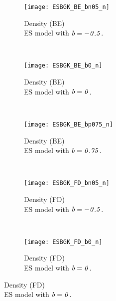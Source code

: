 \documentclass{rsproca}%
\begin{document}
\begin{figure}
        \centering
        \begin{subfigure}[b]{0.32\textwidth}
                \centering
                \texttt{[image: ESBGK\_BE\_bn05\_n]}
                \caption{Density (BE) \\ ES model with $\it{b=-0.5}$.}
                \label{fig:ESBGK_BE_bn05_n}
        \end{subfigure}%
        ~ %
        \begin{subfigure}[b]{0.32\textwidth}
                \centering
                \texttt{[image: ESBGK\_BE\_b0\_n]}
                \caption{Density (BE) \\ ES model with $\it{b=0}$.}
                \label{fig:ESBGK_BE_b0_n}
        \end{subfigure}
        ~ %
        \begin{subfigure}[b]{0.32\textwidth}
                \centering
                \texttt{[image: ESBGK\_BE\_bp075\_n]}
                \caption{Density (BE) \\ ES model with $\it{b=0.75}$.}
                \label{fig:ESBGK_BE_bp075_n}
        \end{subfigure}
				~ %
				\begin{subfigure}[b]{0.32\textwidth}
                \centering
                \texttt{[image: ESBGK\_FD\_bn05\_n]}
                \caption{Density (FD) \\ ES model with $\it{b=-0.5}$.}
                \label{fig:ESBGK_FD_bn05_n}
        \end{subfigure}%
        ~ %
        \begin{subfigure}[b]{0.32\textwidth}
                \centering
                \texttt{[image: ESBGK\_FD\_b0\_n]}
                \caption{Density (FD) \\ ES model with $\it{b=0}$.}

\end{subfigure}
\end{figure}
\end{document}
